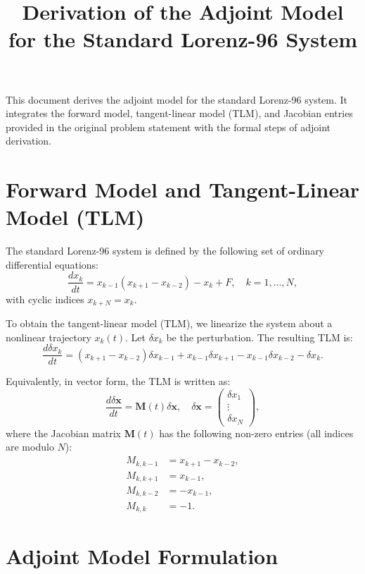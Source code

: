 \documentclass[11pt]{article}
\title{\textbf{Derivation of the Adjoint Model for the Standard Lorenz-96 System}}
\author{}
\date{}
\begin{document}
\maketitle

This document derives the adjoint model for the standard Lorenz-96 system. It integrates the forward model, tangent-linear model (TLM), and Jacobian entries provided in the original problem statement with the formal steps of adjoint derivation.

\section{Forward Model and Tangent-Linear Model (TLM)}

The standard Lorenz-96 system is defined by the following set of ordinary differential equations:
\begin{equation}
    \frac{dx_k}{dt} = x_{k-1}(x_{k+1} - x_{k-2}) - x_k + F, \quad k = 1, \dots, N,
\end{equation}
with cyclic indices $x_{k+N} = x_k$.

To obtain the tangent-linear model (TLM), we linearize the system about a nonlinear trajectory $x_k(t)$. Let $\delta x_k$ be the perturbation. The resulting TLM is:
\begin{equation}
    \frac{d \delta x_k}{dt} = (x_{k+1} - x_{k-2}) \delta x_{k-1} + x_{k-1} \delta x_{k+1} - x_{k-1} \delta x_{k-2} - \delta x_k.
\end{equation}

Equivalently, in vector form, the TLM is written as:
\begin{equation}
    \frac{d \delta \mathbf{x}}{dt} = \mathbf{M}(t) \delta \mathbf{x}, \quad \delta \mathbf{x} = \begin{pmatrix} \delta x_1 \\ \vdots \\ \delta x_N \end{pmatrix},
\end{equation}
where the Jacobian matrix $\mathbf{M}(t)$ has the following non-zero entries (all indices are modulo $N$):
\begin{align}
    M_{k,k-1} &= x_{k+1} - x_{k-2}, \\
    M_{k,k+1} &= x_{k-1}, \\
    M_{k,k-2} &= -x_{k-1}, \\
    M_{k,k} &= -1.
\end{align}

\section{Adjoint Model Formulation}
\end{document}
